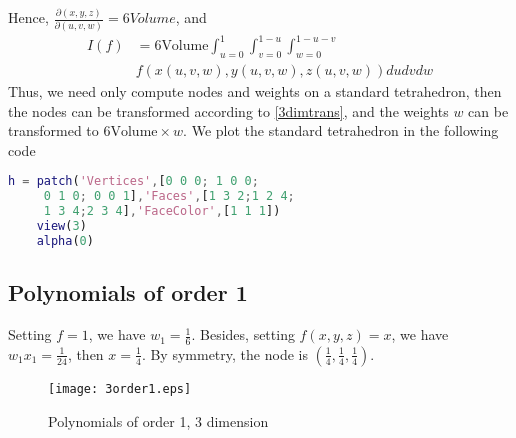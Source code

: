 \documentclass[conference,onecolumn, 12pt]{IEEEtran}
\begin{document}
Hence, $\frac{\partial(x,y,z)}{\partial(u,v,w)}=6Volume$, and 
\begin{equation}
    \begin{split}
        I(f) &= 6\text{Volume} \int_{u=0}^1\int_{v=0}^{1-u}\int_{w=0}^{1-u-v} \\
        &f(x(u,v,w),y(u,v,w),z(u,v,w)) dudvdw
    \end{split}
\end{equation}
Thus, we need only compute nodes and weights on a standard tetrahedron, then the nodes can be transformed according to \ref{3dimtrans}, and the weights $w$ can be transformed to $6\text{Volume}\times w$. We plot the standard tetrahedron in the following code
\begin{lstlisting}[language=matlab]
    h = patch('Vertices',[0 0 0; 1 0 0;
     0 1 0; 0 0 1],'Faces',[1 3 2;1 2 4;
     1 3 4;2 3 4],'FaceColor',[1 1 1])
    view(3)
    alpha(0)
\end{lstlisting}
\subsection{Polynomials of order 1}
Setting $f=1$, we have $w_1=\frac{1}{6}$. Besides, setting $f(x,y,z)=x$, we have $w_1x_1=\frac{1}{24}$, then $x=\frac{1}{4}$. By symmetry, the node is $\left(\frac{1}{4},\frac{1}{4},\frac{1}{4}\right)$.
\begin{figure}[!htbp]
    \centering
    \texttt{[image: 3order1.eps]}
    \caption{Polynomials of order 1, 3 dimension}
    \label{3p1}
\end{figure}
\end{document}
